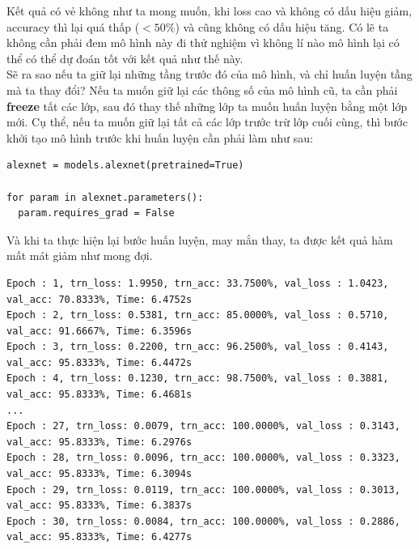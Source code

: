 \documentclass[a4paper]{article}
\begin{document}
Kết quả có vẻ không như ta mong muốn, khi loss cao và không có dấu hiệu giảm, accuracy thì lại quá thấp ($< 50\%$) và cũng không có dấu hiệu tăng. Có lẽ ta không cần phải đem mô hình này đi thử nghiệm vì không lí nào mô hình lại có thể có thể dự đoán tốt với kết quả như thế này.\\
Sẽ ra sao nếu ta giữ lại những tầng trước đó của mô hình, và chỉ huấn luyện tầng mà ta thay đổi? Nếu ta muốn giữ lại các thông số của mô hình cũ, ta cần phải \textbf{freeze} tất các lớp, sau đó thay thế những lớp ta muốn huấn luyện bằng một lớp mới. Cụ thể, nếu ta muốn giữ lại tất cả các lớp trước trừ lớp cuối cùng, thì bước khởi tạo mô hình trước khi huấn luyện cần phải làm như sau:
\begin{lstlisting}
alexnet = models.alexnet(pretrained=True)

for param in alexnet.parameters():
  param.requires_grad = False
\end{lstlisting}
Và khi ta thực hiện lại bước huấn luyện, may mắn thay, ta được kết quả hàm mất mát giảm như mong đợi.
\begin{verbatim}
Epoch : 1, trn_loss: 1.9950, trn_acc: 33.7500%, val_loss : 1.0423, val_acc: 70.8333%, Time: 6.4752s
Epoch : 2, trn_loss: 0.5381, trn_acc: 85.0000%, val_loss : 0.5710, val_acc: 91.6667%, Time: 6.3596s
Epoch : 3, trn_loss: 0.2200, trn_acc: 96.2500%, val_loss : 0.4143, val_acc: 95.8333%, Time: 6.4472s
Epoch : 4, trn_loss: 0.1230, trn_acc: 98.7500%, val_loss : 0.3881, val_acc: 95.8333%, Time: 6.4681s
...
Epoch : 27, trn_loss: 0.0079, trn_acc: 100.0000%, val_loss : 0.3143, val_acc: 95.8333%, Time: 6.2976s
Epoch : 28, trn_loss: 0.0096, trn_acc: 100.0000%, val_loss : 0.3323, val_acc: 95.8333%, Time: 6.3094s
Epoch : 29, trn_loss: 0.0119, trn_acc: 100.0000%, val_loss : 0.3013, val_acc: 95.8333%, Time: 6.3837s
Epoch : 30, trn_loss: 0.0084, trn_acc: 100.0000%, val_loss : 0.2886, val_acc: 95.8333%, Time: 6.4277s
\end{verbatim}
\end{document}
